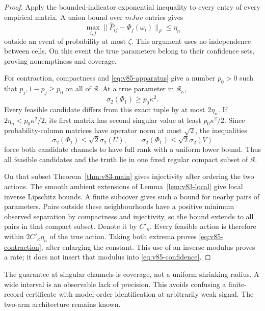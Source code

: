 \begin{proof}
Apply the bounded-indicator exponential inequality to every entry of
every empirical matrix. A union bound over $mJuv$ entries gives
\[
       \max_{i,j}\|\widehat P_{ij}-\Phi_j(\omega_i)\|_F
                                                    \le\eta_n
\]
outside an event of probability at most $\zeta$. This argument uses
no independence between cells. On this event the true parameters
belong to their confidence sets, proving nonemptiness and coverage.

For contraction, compactness and \eqref{eq:v85-apparatus} give a
number $p_0>0$ such that $p_j,1-p_j\ge p_0$ on all of
$\mathfrak K$. At a true parameter in $\mathfrak K_\kappa$,
\[
       \sigma_2(\Phi_1)\ge p_0\kappa^2.
\]
Every feasible candidate differs from this exact tuple by at most
$2\eta_n$. If $2\eta_n<p_0\kappa^2/2$, its first matrix has second
singular value at least $p_0\kappa^2/2$. Since probability-column
matrices have operator norm at most $\sqrt2$, the inequalities
\[
 \sigma_2(\Phi_1)\le\sqrt2\sigma_2(U),\qquad
 \sigma_2(\Phi_1)\le\sqrt2\sigma_2(V)
\]
force both candidate channels to have full rank with a uniform lower
bound. Thus all feasible candidates and the truth lie in one fixed
regular compact subset of $\mathfrak K$.

On that subset Theorem~\ref{thm:v83-main} gives injectivity after
ordering the two actions. The smooth ambient extensions of
Lemma~\ref{lem:v83-local} give local inverse Lipschitz bounds. A finite
subcover gives such a bound for nearby pairs of parameters. Pairs
outside these neighbourhoods have a positive minimum observed
separation by compactness and injectivity, so the bound extends to
all pairs in that compact subset. Denote it by $C'\!_\kappa$.
Every feasible action is therefore within $2C'\!_\kappa\eta_n$ of
the true action. Taking both extrema proves
\eqref{eq:v85-contraction}, after enlarging the constant. This use of
an inverse modulus proves a rate; it does not insert that modulus
into \eqref{eq:v85-confidence}.
\end{proof}
The guarantee at singular channels is coverage, not a uniform shrinking
radius. A wide interval is an observable lack of precision. This avoids
confusing a finite-record certificate with model-order identification
at arbitrarily weak signal. The two-arm architecture remains known.


